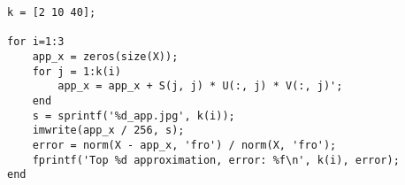\documentclass[12pt]{article}
\begin{document}
\begin{enumerate}[1)]
\begin{enumerate}[(a)]
\begin{lstlisting}
k = [2 10 40];

for i=1:3
    app_x = zeros(size(X));
    for j = 1:k(i)
        app_x = app_x + S(j, j) * U(:, j) * V(:, j)';
    end
    s = sprintf('%d_app.jpg', k(i));
    imwrite(app_x / 256, s);
    error = norm(X - app_x, 'fro') / norm(X, 'fro');
    fprintf('Top %d approximation, error: %f\n', k(i), error);
end
        \end{lstlisting}
    \end{enumerate}
\end{enumerate}


 
\end{document}
